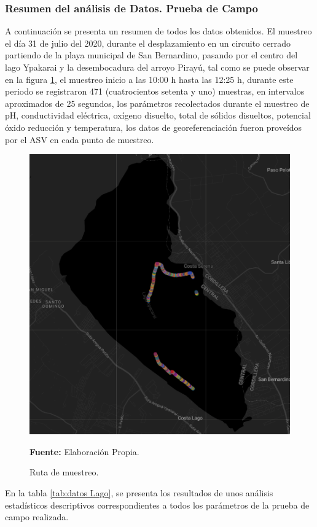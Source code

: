 \subsubsection{Resumen del an\'alisis de Datos. Prueba de Campo}
A continuaci\'on se presenta un resumen de todos los datos obtenidos.
El muestreo el día 31 de julio del 2020, durante el desplazamiento en un circuito cerrado partiendo de la playa municipal de San Bernardino, pasando por el centro del lago Ypakarai  y la desembocadura del arroyo Piray\'u, tal como se puede observar en la figura \ref{fig:ruta}, el muestreo inicio a las 10:00 h hasta las 12:25 h, durante este periodo se registraron 471 (cuatrocientos setenta y uno) muestras, en intervalos aproximados de 25 segundos, los par\'ametros  recolectados durante el muestreo de pH, conductividad el\'ectrica, ox\'igeno disuelto, total de s\'olidos disueltos, potencial \'oxido reducci\'on y temperatura, los datos de georeferenciaci\'on fueron prove\'idos por el ASV en cada punto de muestreo.
\begin{figure}[H]
        \centering
        \includegraphics[width=0.8\linewidth]{Imagenes/cap4/Recorrido.png}
        \caption {Ruta de muestreo. }{\textbf{Fuente:}
        Elaboraci\'on Propia. }
        \label{fig:ruta}
\end{figure}

En la tabla \ref{tab:datos Lago}, se presenta los resultados de unos an\'alisis estadísticos descriptivos correspondientes a todos los par\'ametros de la prueba de campo realizada.

